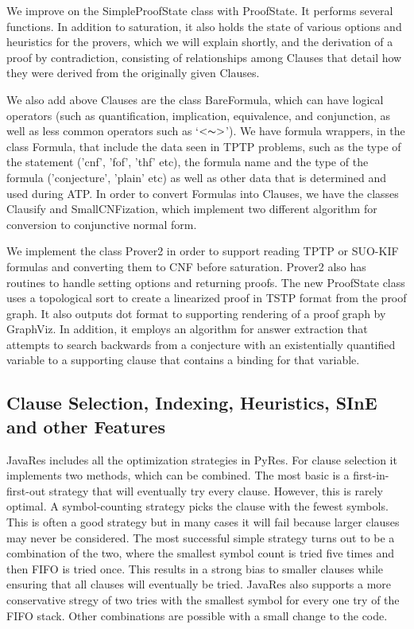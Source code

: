\documentclass{llncs}
\begin{document}
We improve on the SimpleProofState class with ProofState. It performs
several functions.  In addition to saturation, it also holds the state
of various options and heuristics for the provers, which we will
explain shortly, and the derivation of a proof by contradiction,
consisting of relationships among Clauses that detail how they were
derived from the originally given Clauses.

We also add above Clauses are the class BareFormula, which can have
logical operators (such as quantification, implication, equivalence,
and conjunction, as well as less common operators such as
`$<\thicksim>$').  We have formula wrappers, in the class Formula,
that include the data seen in TPTP problems, such as the type of the
statement ('cnf', 'fof', 'thf' etc), the formula name and the type of
the formula ('conjecture', 'plain' etc) as well as other data that is
determined and used during ATP. In order to convert Formulas into
Clauses, we have the classes Clausify and SmallCNFization, which
implement two different algorithm for conversion to conjunctive normal
form.

We implement the class Prover2 in order to support reading TPTP or
SUO-KIF formulas and converting them to CNF before saturation.
Prover2 also has routines to handle setting options and returning
proofs.  The new ProofState class uses a topological sort
\cite{DBLP:journals/cacm/Kahn62} to create a linearized proof in TSTP
format from the proof graph.  It also outputs dot format to supporting
rendering of a proof graph by GraphViz.  In addition, it employs an
algorithm for answer extraction that attempts to search backwards from
a conjecture with an existentially quantified variable to a supporting
clause that contains a binding for that variable.

\subsection{Clause Selection, Indexing, Heuristics, SInE and other Features}

JavaRes includes all the optimization strategies in PyRes.  For clause
selection it implements two methods, which can be combined.  The most
basic is a first-in-first-out strategy that will eventually try every
clause.  However, this is rarely optimal.  A symbol-counting strategy
picks the clause with the fewest symbols.  This is often a good
strategy but in many cases it will fail because larger clauses may
never be considered.  The most successful simple strategy turns out to
be a combination of the two, where the smallest symbol count is tried
five times and then FIFO is tried once.  This results in a strong bias
to smaller clauses while ensuring that all clauses will eventually be
tried.  JavaRes also supports a more conservative stregy of two tries
with the smallest symbol for every one try of the FIFO stack.  Other
combinations are possible with a small change to the code.
\end{document}
